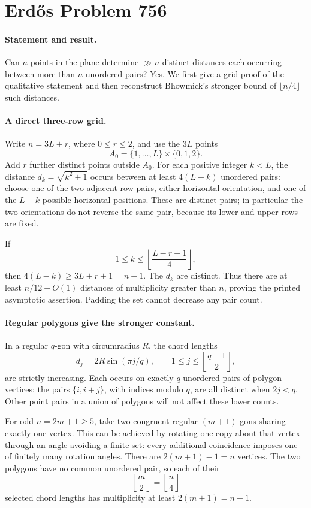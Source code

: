 \section*{Erd\H{o}s Problem 756}

\paragraph{Statement and result.}
Can \(n\) points in the plane determine \(\gg n\) distinct distances each occurring between more than \(n\) unordered pairs? Yes. We first give a grid proof of the qualitative statement and then reconstruct Bhowmick's stronger bound of \(\lfloor n/4\rfloor\) such distances.

\paragraph{A direct three-row grid.}
Write \(n=3L+r\), where \(0\leq r\leq2\), and use the \(3L\) points
\[
 A_0=\{1,\ldots,L\}\times\{0,1,2\}.
\]
Add \(r\) further distinct points outside \(A_0\). For each positive integer \(k<L\), the distance \(d_k=\sqrt{k^2+1}\) occurs between at least \(4(L-k)\) unordered pairs: choose one of the two adjacent row pairs, either horizontal orientation, and one of the \(L-k\) possible horizontal positions. These are distinct pairs; in particular the two orientations do not reverse the same pair, because its lower and upper rows are fixed.

If
\[
 1\leq k\leq\left\lfloor\frac{L-r-1}{4}\right\rfloor,
\]
then \(4(L-k)\geq3L+r+1=n+1\). The \(d_k\) are distinct. Thus there are at least \(n/12-O(1)\) distances of multiplicity greater than \(n\), proving the printed asymptotic assertion. Padding the set cannot decrease any pair count.

\paragraph{Regular polygons give the stronger constant.}
In a regular \(q\)-gon with circumradius \(R\), the chord lengths
\[
 d_j=2R\sin(\pi j/q),\qquad
 1\leq j\leq\left\lfloor\frac{q-1}{2}\right\rfloor,
\]
are strictly increasing. Each occurs on exactly \(q\) unordered pairs of polygon vertices: the pairs \(\{i,i+j\}\), with indices modulo \(q\), are all distinct when \(2j<q\). Other point pairs in a union of polygons will not affect these lower counts.

For odd \(n=2m+1\geq5\), take two congruent regular \((m+1)\)-gons sharing exactly one vertex. This can be achieved by rotating one copy about that vertex through an angle avoiding a finite set: every additional coincidence imposes one of finitely many rotation angles. There are \(2(m+1)-1=n\) vertices. The two polygons have no common unordered pair, so each of their
\[
 \left\lfloor\frac m2\right\rfloor=\left\lfloor\frac n4\right\rfloor
\]
selected chord lengths has multiplicity at least \(2(m+1)=n+1\).

